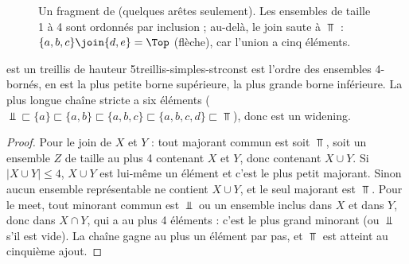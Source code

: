 \begin{figure}[htbp]\centering
{}
\caption{Un fragment de  (quelques arêtes seulement). Les
ensembles de taille 1 à 4 sont ordonnés par inclusion ; au-delà, le join
saute à $\Top$ : $\{a,b,c\} \join \{d,e\} = \Top$ (flèche), car l'union a cinq
éléments.}
\label{fig:treillis-simples-hasse-strconst}
\end{figure}

\begin{proposition}{ est un treillis de hauteur 5}{treillis-simples-strconst}
   est l'ordre des ensembles 4-bornés,  en est
  la plus petite borne supérieure,  la plus grande borne
  inférieure. La plus longue chaîne stricte a six éléments
  ($\Bot \sqsubset \{a\} \sqsubset \{a,b\} \sqsubset \{a,b,c\} \sqsubset
  \{a,b,c,d\} \sqsubset \Top$), donc  est un widening.
\end{proposition}
\begin{proof}
  Pour le join de $X$ et $Y$ : tout majorant commun est soit $\Top$, soit un
  ensemble $Z$ de taille au plus 4 contenant $X$ et $Y$, donc contenant
  $X \cup Y$. Si $|X \cup Y| \le 4$, $X \cup Y$ est lui-même un élément et
  c'est le plus petit majorant. Sinon aucun ensemble représentable ne contient
  $X \cup Y$, et le seul majorant est $\Top$. Pour le meet, tout minorant
  commun est $\Bot$ ou un ensemble inclus dans $X$ et dans $Y$, donc dans
  $X \cap Y$, qui a au plus 4 éléments : c'est le plus grand minorant (ou
  $\Bot$ s'il est vide). La chaîne gagne au plus un élément par pas, et
  $\Top$ est atteint au cinquième ajout.
\end{proof}

